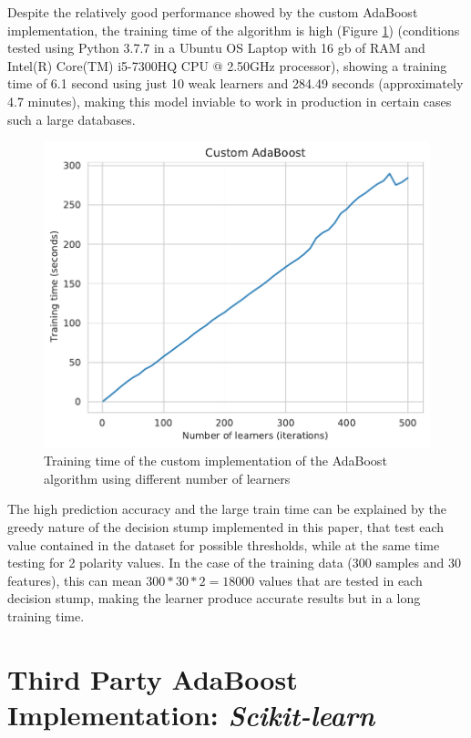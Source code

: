 \documentclass[11pt,twocolumn,letterpaper]{article}
\begin{document}
Despite the relatively good performance showed by the custom AdaBoost implementation, the training time of the algorithm is high (Figure \ref{fig:time_custom}) (conditions tested using Python 3.7.7 in a Ubuntu OS Laptop with 16 gb of RAM and Intel(R) Core(TM) i5-7300HQ CPU @ 2.50GHz processor), showing a training time of 6.1 second using just 10 weak learners and 284.49 seconds (approximately 4.7 minutes), making this model inviable to work in production in certain cases such a large databases.

\begin{figure}[h]
	\begin{center}
		\includegraphics[width=1.0\linewidth]{train_time_custom.pdf}
		\caption{Training time of the custom implementation of the AdaBoost algorithm using different number of learners}
		\label{fig:time_custom}
	\end{center}
\end{figure}

The high prediction accuracy and the large train time can be explained by the greedy nature of the decision stump implemented in this paper, that test each value contained in the dataset for possible thresholds, while at the same time testing for 2 polarity values. In the case of the training data (300 samples and 30 features), this can mean $300*30*2 = 18000$ values that are tested in each decision stump, making the learner produce accurate results but in a long training time.

\section{Third Party AdaBoost Implementation: \textit{Scikit-learn}}
\end{document}

